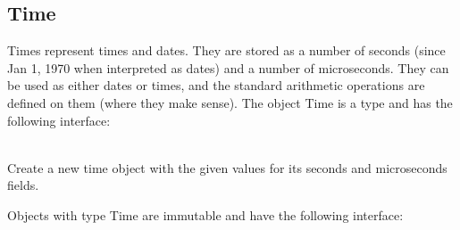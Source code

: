 \subsection{Time}
\label{builtin Time}
Times represent times and dates.  They are stored as a number of
seconds (since Jan 1, 1970 when interpreted as dates) and a number of
microseconds.  They can be
used as either dates or times, and the standard arithmetic operations
are defined on them (where they make sense).  The object Time is a type
and has the following interface:

\begin{desc}
  \item[\kw{operation} create\/\LB{}seconds \CO{} \tn{Integer}, microseconds \CO{} \tn{Integer}\/\RB{} \returns{} \/\LB{}Time\/\RB{}]~\\
    Create a new time object with the given values for its seconds and
    microseconds fields.
\end{desc}

\noindent Objects with type Time are immutable and have the following
interface:

